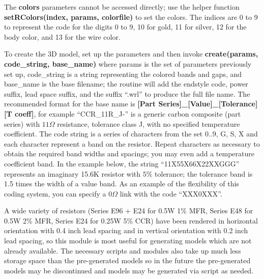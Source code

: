 The \textbf{colors} parameters cannot be accessed directly; use the helper function
\textbf{setRColors(index, params, colorfile)} to set the colors. The indices are
0 to 9 to represent the code for the digits 0 to 9, 10 for gold, 11 for silver,
12 for the body color, and 13 for the wire color.

To create the 3D model, set up the parameters and then invoke
\textbf{create(params, code\_string, base\_name)} where params is the
set of parameters previously set up, code\_string is a string representing
the colored bands and gaps, and base\_name is the base filename; the
routine will add the endstyle code, power suffix, lead space suffix, and the
suffix ``.wrl'' to produce the full file name. The recommended format for the
base name is \textbf{[Part Series]\_[Value]\_[Tolerance][T coeff]}, for example
``CCR\_11R\_J-'' is a generic carbon composite (part series) with $11\Omega$
resistance, tolerance class J, with no specified temperature coefficient.
The code string is a series of characters from the set 0..9, G, S, X and
each character represent a band on the resistor. Repeat characters as
necessary to obtain the required band widths and spacings; you may even
add a temperature coefficient band. In the example below, the string
``11X55X66X22XXGGG'' represents an imaginary 15.6K resistor with $5\%$
tolerance; the tolerance band is 1.5 times the width of a value band.
As an example of the flexibility of this coding system, you can specify
a $0\Omega$ link with the code ``XXX0XXX''.

A wide variety of resistors (Series E96 + E24 for 0.5W 1\% MFR, Series E48
for 0.5W 2\% MFR, Series E24 for 0.25W 5\% CCR) have been rendered in
horizontal orientation with 0.4 inch lead spacing and in vertical
orientation with 0.2 inch lead spacing, so this module is most useful
for generating models which are not already available. The necessary
scripts and modules also take up much less storage space than the
pre-generated models so in the future the pre-generated models may
be discontinued and models may be generated via script as needed.

